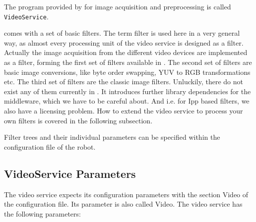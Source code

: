 The program provided by \miro for image acquisition and preprocessing
is called {\tt VideoService}.

\miro comes with a set of basic filters. The term filter is used here
in a very general way, as almost every processing unit of the video
service is designed as a filter. Actually the image acquisition from
the different video devices are implemented as a filter, forming the
first set of filters available in \miro. The second set of filters are
basic image conversions, like byte order swapping, YUV to RGB
transformations etc. The third set of filters are the classic image
filters. Unluckily, there do not exist any of them currently in \miro.
It introduces further library dependencies for the middleware, which
we have to be careful about. And i.e. for Ipp based filters, we also
have a licensing problem. How to extend the video service to process
your own filters is covered in the following subsection.

Filter trees and their individual parameters can be specified within
the configuration file of the robot. 

\subsection{VideoService Parameters}

The video service expects its configuration parameters with the
section Video of the configuration file. Its parameter is
also called Video. The
video service has the following parameters:

